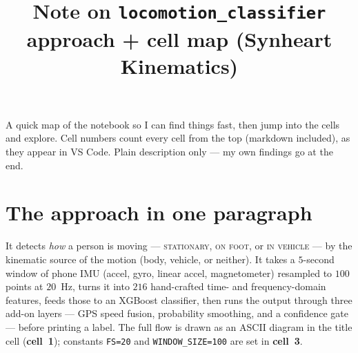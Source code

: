 \documentclass[11pt]{article}
\title{Note on \texttt{locomotion\_classifier}\\[2pt]
\large approach + cell map (Synheart Kinematics)}
\date{}
\begin{document}
\maketitle

A quick map of the notebook so I can find things fast, then jump into the cells and
explore. Cell numbers count every cell from the top (markdown included), as they
appear in VS Code. Plain description only --- my own findings go at the end.

\section{The approach in one paragraph}
It detects \emph{how} a person is moving --- \textsc{stationary},
\textsc{on foot}, or \textsc{in vehicle} --- by the kinematic source of the motion
(body, vehicle, or neither). It takes a $5$-second window of phone IMU
(accel, gyro, linear accel, magnetometer) resampled to $100$ points at $20$~Hz,
turns it into $216$ hand-crafted time- and frequency-domain features, feeds those to
an XGBoost classifier, then runs the output through three add-on layers --- GPS
speed fusion, probability smoothing, and a confidence gate --- before printing a
label. The full flow is drawn as an ASCII diagram in the title cell
(\textbf{cell~1}); constants \texttt{FS=20} and \texttt{WINDOW\_SIZE=100} are set in
\textbf{cell~3}.
\end{document}
